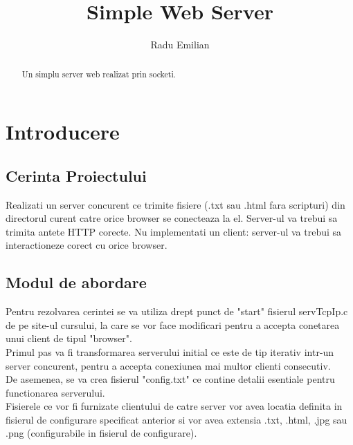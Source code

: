 \documentclass{llncs}
\begin{document}
\title{Simple Web Server}


\author{Radu Emilian}
\maketitle

\begin{abstract}
Un simplu server web realizat prin socketi.

\end{abstract}


\section{Introducere}

\subsection{Cerinta Proiectului}
Realizati un server concurent ce trimite fisiere (.txt sau .html fara scripturi)
din directorul curent catre orice browser se conecteaza la el. Server-ul va trebui sa trimita antete HTTP corecte. 
Nu implementati un client: server-ul va trebui sa interactioneze corect cu orice browser.
 
\subsection{Modul de abordare}
Pentru rezolvarea cerintei se va utiliza drept punct de "start" fisierul servTcpIp.c de pe site-ul cursului, la care se vor face modificari
pentru a accepta conetarea unui client de tipul "browser".\\
Primul pas va fi transformarea serverului initial ce este de tip iterativ intr-un server concurent, pentru a accepta conexiunea mai multor
clienti consecutiv.\\
De asemenea, se va crea fisierul "config.txt" ce contine detalii esentiale pentru functionarea serverului.\\
Fisierele ce vor fi furnizate clientului de catre server vor avea locatia definita in fisierul de configurare specificat anterior si vor avea
extensia .txt, .html, .jpg sau .png (configurabile in fisierul de configurare).
\end{document}
